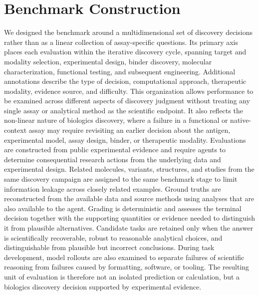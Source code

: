 \documentclass[10pt,letterpaper]{article}
\begin{document}
{\begin{minipage}[t]{0.47\textwidth}
\section{Benchmark Construction}
We designed the benchmark around a multidimensional set of discovery decisions rather than as a linear collection of assay-specific questions. Its primary axis places each evaluation within the iterative discovery cycle, spanning target and modality selection, experimental design, binder discovery, molecular characterization, functional testing, and subsequent engineering. Additional annotations describe the type of decision, computational approach, therapeutic modality, evidence source, and difficulty. This organization allows performance to be examined across different aspects of discovery judgment without treating any single assay or analytical method as the scientific endpoint. It also reflects the non-linear nature of biologics discovery, where a failure in a functional or native-context assay may require revisiting an earlier decision about the antigen, experimental model, assay design, binder, or therapeutic modality.
\TwoColParaBreak
Evaluations are constructed from public experimental evidence and require agents to determine consequential research actions from the underlying data and experimental design. Related molecules, variants, structures, and studies from the same discovery campaign are assigned to the same benchmark stage to limit information leakage across closely related examples. Ground truths are reconstructed from the available data and source methods using analyses that are also available to the agent. Grading is deterministic and assesses the terminal decision together with the supporting quantities or evidence needed to distinguish it from plausible alternatives. Candidate tasks are retained only when the answer is scientifically recoverable, robust to reasonable analytical choices, and distinguishable from plausible but incorrect conclusions. During task development, model rollouts are also examined to separate failures of scientific reasoning from failures caused by formatting, software, or tooling. The resulting unit of evaluation is therefore not an isolated prediction or calculation, but a biologics discovery decision supported by experimental evidence.

\end{minipage}
}

\clearpage
\end{document}
